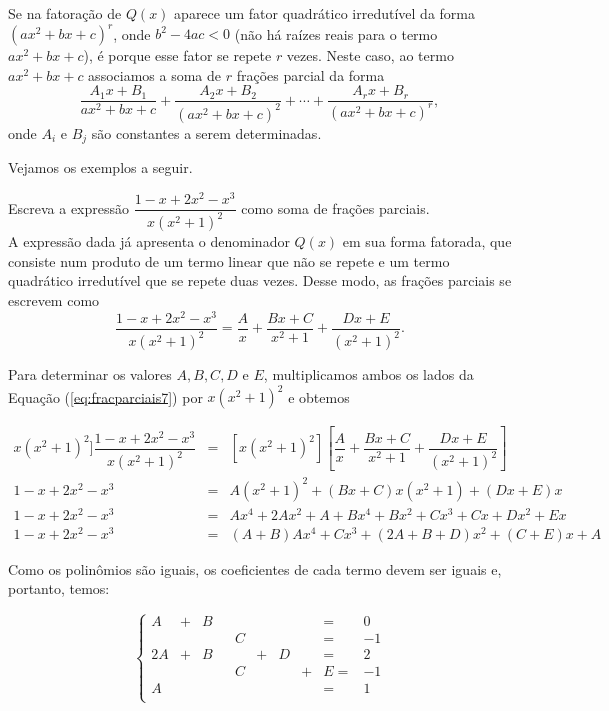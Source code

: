 Se na fatoração de $Q(x)$ aparece um fator quadrático irredutível da forma $(ax^2 + bx + c)^r$, onde $b^2 - 4ac < 0$ (não há raízes reais para o termo $ax^2 + bx + c$), é porque esse fator se repete $r$ vezes. Neste caso, ao termo $ax^2 + bx + c$ associamos a soma de $r$ frações parcial da forma
$$\dfrac{A_1x + B_1}{ax^2 + bx + c} + \dfrac{A_2x + B_2}{(ax^2 + bx + c)^2} + \cdots  + \dfrac{A_rx + B_r}{(ax^2 + bx + c)^r},$$
onde $A_i$ e $B_j$ são constantes a serem determinadas.

Vejamos os exemplos a seguir.

\begin{exem}
    Escreva a expressão $\dfrac{1 - x + 2x^2 - x^3}{x(x^2 + 1)^2}$ como soma de frações parciais. \\[10pt]

   A expressão dada já apresenta o denominador $Q(x)$ em sua forma fatorada, que consiste num produto de um termo linear que não se repete e um termo quadrático irredutível que se repete duas vezes. Desse modo, as frações parciais se escrevem como 
    \begin{equation}
    \label{eq:fracparciais7}
    \dfrac{1 - x + 2x^2 - x^3}{x(x^2 + 1)^2} = \dfrac{A}{x} + \dfrac{Bx + C}{x^2+1} + \dfrac{Dx + E}{(x^2+1)^2}.
    \end{equation}

    Para determinar os valores $A, B,C, D$ e $E$, multiplicamos ambos os lados da Equação (\ref{eq:fracparciais7}) por $x(x^2 + 1)^2$ e obtemos

    \begin{eqnarray*}
    x(x^2 + 1)^2]\dfrac{1 - x + 2x^2 - x^3}{x(x^2 + 1)^2} & = & [x(x^2 + 1)^2] \left[\dfrac{A}{x} + \dfrac{Bx + C}{x^2+1} + \dfrac{Dx + E}{(x^2+1)^2}\right]\\[5pt]
    1 - x + 2x^2 - x^3 & =& A(x^2 + 1)^2 + (Bx + C)x(x^2+1) + (Dx + E)x \\[5pt]
    1 - x + 2x^2 - x^3 & =& Ax^4 + 2Ax^2 + A + Bx^4 + Bx^2 + Cx^3 + Cx  + Dx^2 + Ex\\[5pt]
    1 - x + 2x^2 - x^3 & = & (A + B)Ax^4 + Cx^3 + (2A+B + D)x^2 + (C + E)x + A
    \end{eqnarray*}

    Como os polinômios são iguais, os coeficientes de cada termo devem ser iguais e, portanto, temos:

    \begin{equation*}
    \left\{ \begin{array}{ccccccccccc} 
    A & + & B &  &  & & & &=& 0 \\[5pt]
     &  &  & & C & &  & &=& -1\\[5pt]
    2A & + & B &  &  &+& D& &=& 2\\[5pt]
     &  &  & & C& &  &+ & E=& -1\\[5pt]
     A &  &  & & & &  & &=& 1\\[5pt]
    \end{array}
    \right.    
    \end{equation*}


\end{exem}
